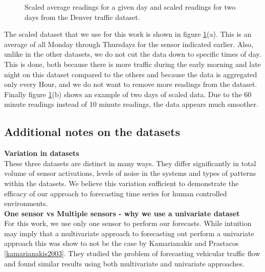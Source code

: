 \begin{figure}[h]
	\begin{center}
	\end{center}
	\caption{Scaled average readings for a given day and scaled readings for two days from the Denver traffic dataset.}
	\label{fig:denver_scaled}
\end{figure}

The scaled dataset that we use for this work is shown in figure \ref{fig:denver_scaled}(a).  This is an average of all Monday through Thursdays for the sensor indicated earlier.  Also, unlike in the other datasets, we do not cut the data down to specific times of day.  This is done, both because there is more traffic during the early morning and late night on this dataset compared to the others and because the data is aggregated only every Hour, and we do not want to remove more readings from the dataset.  Finally figure \ref{fig:denver_scaled}(b) shows an example of two days of scaled data.  Due to the 60 minute readings instead of 10 minute readings, the data appears much smoother.  


\subsection{Additional notes on the datasets} 

\noindent
\textbf{Variation in datasets} \\
These three datasets are distinct in many ways.  They differ significantly in total volume of sensor activations, levels of noise in the systems and types of patterns within the datasets.  We believe this variation sufficient to demonstrate the efficacy of our approach to forecasting time series for human controlled environments. \\

\noindent
\textbf{One sensor vs Multiple sensors - why we use a univariate dataset} \\
For this work, we use only one sensor to perform our forecasts.  While intuition may imply that a multivariate approach to forecasting out perform a univariate approach this was show to not be the case by Kamarianakis and Prastacos \ref{kamarianakis2003}.  They studied the problem of forecasting vehicular traffic flow and found similar results using both multivariate and univariate approaches.


